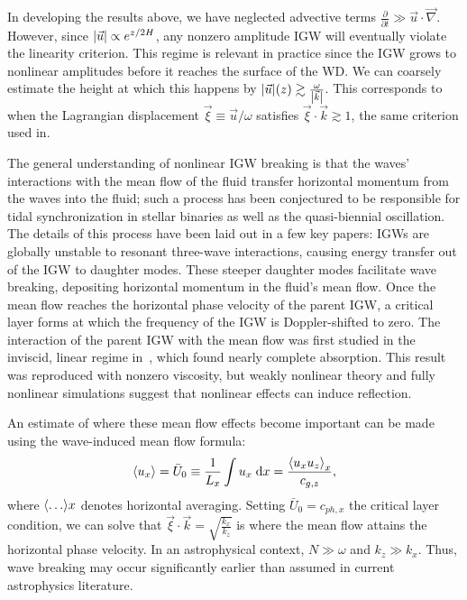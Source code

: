 \documentclass[twocolumn,
        nofootinbib, %
        usenames, %
        aps,
        prd,
        dvipsnames %
    ]{revtex4-1}%
\newcommand*{\pd}[2]{\frac{\partial#1}{\partial#2}}
\DeclarePairedDelimiter\abs{\lvert}{\rvert}
\DeclarePairedDelimiter\ev{\langle}{\rangle}
\begin{document}
In developing the results above, we have neglected advective terms $\pd{}{t} \gg
\vec{u} \cdot \vec{\nabla}$. However, since $\abs*{\vec{u}} \propto e^{z/2H}$,
any nonzero amplitude IGW will eventually violate the linearity criterion. This
regime is relevant in practice since the IGW grows to nonlinear amplitudes
before it reaches the surface of the WD\cite{fullerI,fullerII}. We can coarsely
estimate the height at which this happens by $\abs*{\vec{u}}(z) \gtrsim
\frac{\omega}{\abs*{\vec{k}}}$. This corresponds to when the Lagrangian
displacement $\vec{\xi} \equiv \vec{u} / \omega$ satisfies $\vec{\xi} \cdot
\vec{k} \gtrsim 1$, the same criterion used in\cite{fullerI}.

The general understanding of nonlinear IGW breaking is that the waves'
interactions with the mean flow of the fluid transfer horizontal momentum from
the waves into the fluid; such a process has been conjectured to be responsible
for tidal synchronization in stellar binaries\cite{zahn75,gn89} as well as the
quasi-biennial oscillation\cite{lindzen_qbo}. The details of this process have
been laid out in a few key papers: IGWs are globally unstable to resonant
three-wave interactions\cite{drazin}, causing energy transfer out of the IGW to
daughter modes. These steeper daughter modes facilitate wave breaking,
depositing horizontal momentum in the fluid's mean flow\cite{klostermeyer}. Once
the mean flow reaches the horizontal phase velocity of the parent IGW, a
critical layer forms at which the frequency of the IGW is Doppler-shifted to
zero. The interaction of the parent IGW with the mean flow was first studied in
the inviscid, linear regime in~\cite{booker_bretherton}, which found nearly
complete absorption. This result was reproduced with nonzero
viscosity\cite{hazel}, but weakly nonlinear theory\cite{brown_stewartson} and
fully nonlinear simulations\cite{winters1994} suggest that nonlinear effects can
induce reflection.

An estimate of where these mean flow effects become important can be made using
the wave-induced mean flow formula\cite{eliassen_palm_cite,sutherland0}:
\begin{equation}
     \ev*{u_x} = \bar{U}_0 \equiv \frac{1}{L_x}
        \int\limits u_x\;\mathrm{d}x = \frac{\ev*{u_xu_z}_x}{c_{g,z}},
\end{equation}
where $\ev*{\dots}x$ denotes horizontal averaging. Setting $\bar{U}_0 = c_{ph,
x}$ the critical layer condition, we can solve that $\vec{\xi} \cdot \vec{k}
= \sqrt{\frac{k_x}{k_z}}$ is where the mean flow attains the horizontal phase
velocity. In an astrophysical context, $N \gg \omega$ and $k_z \gg k_x$. Thus,
wave breaking may occur significantly earlier than assumed in current
astrophysics literature.
\end{document}
